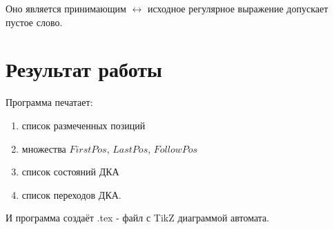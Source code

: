 \documentclass[a4paper,12pt]{article}
\begin{document}
Оно является принимающим $\longleftrightarrow$ исходное регулярное выражение допускает пустое слово.

\section*{Результат работы}

Программа печатает:

\begin{enumerate}
    \item список размеченных позиций
    \item множества $FirstPos$, $LastPos$, $FollowPos$
    \item список состояний ДКА
    \item список переходов ДКА.
\end{enumerate}

И программа создаёт .tex - файл с TikZ диаграммой автомата.
\end{document}

